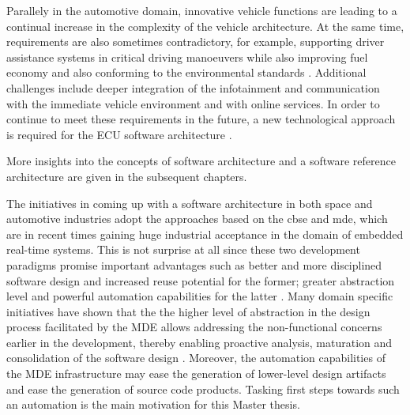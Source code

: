 Parallely in the automotive domain, innovative vehicle functions are leading to a continual increase in the complexity of the vehicle architecture. At the same time, requirements are also sometimes contradictory, for example, supporting driver assistance systems in critical driving manoeuvers while also improving fuel economy and also conforming to the environmental standards \cite{AUTOSARurl}. Additional challenges include deeper integration of the infotainment and communication with the immediate vehicle environment and with online services. In order to continue to meet these requirements in the future, a new technological approach is required for the ECU software architecture \cite{AUTOSARurl}.  

More insights into the concepts of software architecture and a software reference architecture are given in the subsequent chapters.     

The initiatives in coming up with a software architecture in both space and automotive industries adopt the approaches based on the \ac{cbse} and \ac{mde}, which are in recent times gaining huge industrial acceptance in the domain of embedded real-time systems. This is not surprise at all since these two development paradigms promise important advantages such as better and more disciplined software design and increased reuse potential for the former; greater abstraction level and powerful automation capabilities for the latter \cite{CBSE}\cite{PhdThesis}. Many domain specific initiatives have shown that the the higher level of abstraction in the design process facilitated by the MDE allows addressing the non-functional concerns earlier in the development, thereby enabling proactive analysis, maturation and consolidation of the software design \cite{CompBasedDev}. Moreover, the automation capabilities of the MDE infrastructure may ease the generation of lower-level design artifacts and ease the generation of source code products.
Tasking first steps towards such an automation is the main motivation for this Master thesis.

